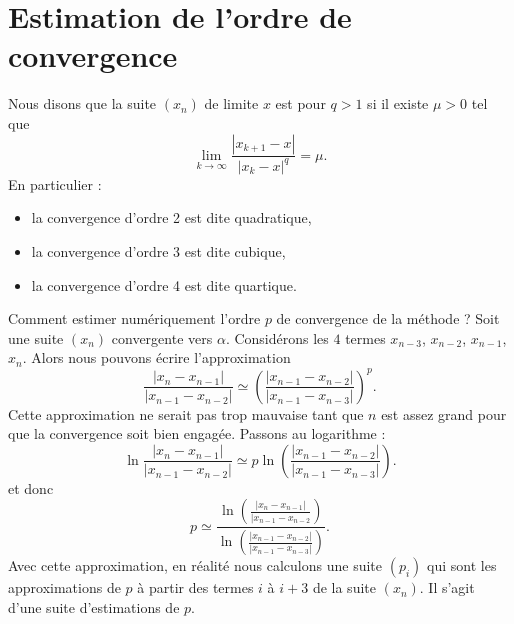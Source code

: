 
\section{Estimation de l'ordre de convergence}

\begin{definition}
	Nous disons que la suite \( (x_n)\) de limite \( x\) est  pour \( q>1\) si il existe \( \mu>0\) tel que
	\begin{equation}
		\lim_{k\to \infty} \frac{ | x_{k+1}-x | }{ | x_k-x |^q }=\mu.
	\end{equation}
	En particulier :
	\begin{itemize}
		\item
		      la convergence d'ordre 2 est dite quadratique,
		\item
		      la convergence d'ordre 3 est dite cubique,
		\item
		      la convergence d'ordre 4 est dite quartique.
	\end{itemize}
\end{definition}

Comment estimer numériquement l'ordre \( p\) de convergence de la méthode ? Soit une suite \( (x_n)\) convergente vers \( \alpha\). Considérons les \( 4\) termes \( x_{n-3}\), \( x_{n-2}\), \( x_{n-1}\), \( x_n\). Alors nous pouvons écrire l'approximation
\begin{equation}
	\frac{ | x_n -x_{n-1}| }{ | x_{n-1}-x_{n-2} | }\simeq \left( \frac{ | x_{n-1}-x_{n-2} | }{ | x_{n-1}-x_{n-3} | } \right)^p.
\end{equation}
Cette approximation ne serait pas trop mauvaise tant que \( n\) est assez grand pour que la convergence soit bien engagée. Passons au logarithme :
\begin{equation}
	\ln \frac{ | x_n -x_{n-1}| }{ | x_{n-1}-x_{n-2} | }\simeq p\ln \left( \frac{ | x_{n-1}-x_{n-2} | }{ | x_{n-1}-x_{n-3} | } \right).
\end{equation}
et donc
\begin{equation}
	p\simeq \frac{ \ln\left( \frac{ | x_n -x_{n-1}| }{ | x_{n-1}-x_{n-2} } \right) }{ \ln \left(\frac{ | x_{n-1}-x_{n-2} | }{ | x_{n-1}-x_{n-3} | } \right)}.
\end{equation}
Avec cette approximation, en réalité nous calculons une suite \( (p_i)\) qui sont les approximations de \( p\) à partir des termes \( i\) à \(i+3 \) de la suite \( (x_n)\). Il s'agit d'une suite d'estimations de \( p\).

